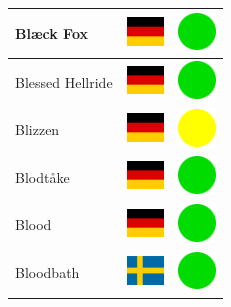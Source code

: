 \documentclass[12pt, a4paper, twoside]{report}
\begin{document}
\begin{center}
\begin{longtable}{|p{5cm}|p{2cm}|p{2cm}|}
Blæck Fox & \includegraphics[width=1cm]{4x3/de} & \includegraphics[width=1cm]{likes/y} \\ \hline
Blessed Hellride & \includegraphics[width=1cm]{4x3/de} & \includegraphics[width=1cm]{likes/y} \\ \hline
Blizzen & \includegraphics[width=1cm]{4x3/de} & \includegraphics[width=1cm]{likes/m} \\ \hline
Blodtåke & \includegraphics[width=1cm]{4x3/de} & \includegraphics[width=1cm]{likes/y} \\ \hline
Blood & \includegraphics[width=1cm]{4x3/de} & \includegraphics[width=1cm]{likes/y} \\ \hline
Bloodbath & \includegraphics[width=1cm]{4x3/se} & \includegraphics[width=1cm]{likes/y} \\ \hline

\end{longtable}
\end{center}
\end{document}
